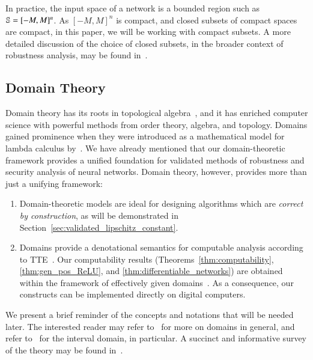 \documentclass[11pt,times]{article}
\begin{document}
In practice, the input space of a network is a bounded region such as
$\mathbb{S} = [-M,M]^n$. As $[-M,M]^n$ is compact, and closed subsets of
compact spaces are compact, in this paper, we will be working with
compact subsets. A more detailed discussion of the choice of closed
subsets, in the broader context of robustness analysis, may be found
in~\parencite{Moggi_Farjudian_Taha:System_Analysis_and_Robustness:ICTCS:2019}.


\subsection{Domain Theory}
\label{subsec:domains_theory}


Domain theory has its roots in topological
algebra~\parencite{Compendium:Book:1980,Keimel:Domain_Ramifications_Interactions:2017}, and it
has enriched computer science with powerful methods from order theory,
algebra, and topology. Domains gained prominence when they were
introduced as a mathematical model for lambda calculus
by~\textcite{Scott:Outline:1970}. We have already mentioned that our
domain-theoretic framework provides a unified foundation for validated
methods of robustness and security analysis of neural networks. Domain
theory, however, provides more than just a unifying framework:

\begin{enumerate}[label=(\arabic*)]

\item Domain-theoretic models are ideal for designing algorithms which
  are \emph{correct by construction}, as will be demonstrated in
  Section~\ref{sec:validated_lipschitz_constant}. 

\item Domains provide a denotational semantics for computable analysis
  according to
  \ac{TTE}~\parencite[Theorem~9.5.2]{Weihrauch2000:book}. Our
  computability results (Theorems~\ref{thm:computability},
  \ref{thm:gen_pos_ReLU}, and \ref{thm:differentiable_networks}) are
  obtained within the framework of effectively given
  domains~\parencite{Smyth:effectively_given_domains:1977}. As a
  consequence, our constructs can be implemented directly on digital
  computers.
\end{enumerate}

We present a brief reminder of the concepts and notations that will be
needed later. The interested reader may refer
to~\parencite{Compendium:Book:1980,AbramskyJung94-DT,Gierz-ContinuousLattices-2003,Goubault-Larrecq:Non_Hausdorff_topology:2013}
for more on domains in general, and refer
to~\parencite{Escardo96-tcs,Edalat:Domains_Physics:1997} for the
interval domain, in particular. A succinct and informative survey of
the theory may be found
in~\parencite{Keimel:Domain_Ramifications_Interactions:2017}.
\end{document}
